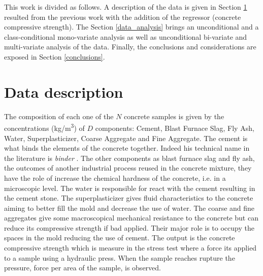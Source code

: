\documentclass[conference]{IEEEtran}
\begin{document}
This work is divided as follows. A description of the data is given in Section \ref{data_description} resulted from the previous work with the addition of the regressor (concrete compressive strength). {\color{red}The Section \ref{data_analysis} brings an unconditional and a class-conditional mono-variate analysis as well as unconditional bi-variate and multi-variate analysis of the data. Finally, the conclusions and considerations are exposed in Section \ref{conclusions}.}


\section{Data description}\label{data_description}

The composition of each one of the $N$ concrete samples is given by the concentrations (kg/m\textsuperscript{3}) of $D$ components: Cement, Blast Furnace Slag, Fly Ash, Water, Superplasticizer, Coarse Aggregate and Fine Aggregate. The cement is what binds the elements of the concrete together. Indeed his technical name in the literature is \emph{binder} \cite{b5}. The other components as blast furnace slag and fly ash, the outcomes of another industrial process reused in the concrete mixture, they have the role of increase the chemical hardness of the concrete, i.e. in a microscopic level. The water is responsible for react with the cement resulting in the cement stone. The superplasticizer gives fluid characteristics to the concrete aiming to better fill the mold and decrease the use of water. The coarse and fine aggregates give some macroscopical mechanical resistance to the concrete but can reduce its compressive strength if bad applied. Their major role is to occupy the spaces in the mold reducing the use of cement. The output is the concrete compressive strength which is measure in the stress test where a force its applied to a sample using a hydraulic press. When the sample reaches rupture the pressure, force per area of the sample, is observed.

\end{document}
